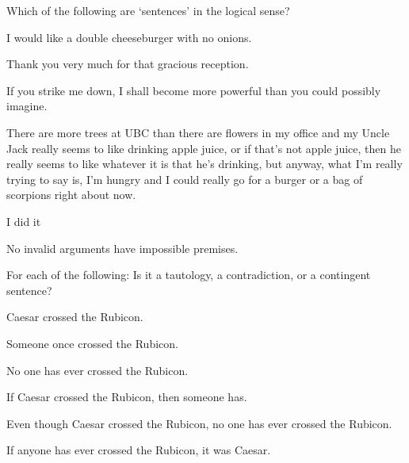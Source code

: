 \problempart
\label{hw1.B}
Which of the following are `sentences' in the logical sense?
	\begin{earg}
		\item I would like a double cheeseburger with no onions.
		\item Thank you very much for that gracious reception.
		\item If you strike me down, I shall become more powerful than you could possibly imagine.
		\item There are more trees at UBC than there are flowers in my office and my Uncle Jack really seems to like drinking apple juice, or if that's not apple juice, then he really seems to like whatever it is that he's drinking, but anyway, what I'm really trying to say is, I'm hungry and I could really go for a burger or a bag of scorpions right about now.
		\item I did it
		\item No invalid arguments have impossible premises.
	\end{earg}

\problempart
\label{pr.EnglishTautology}
For each of the following: Is it a tautology, a contradiction, or a contingent sentence?
\begin{earg}
\item Caesar crossed the Rubicon.
\item Someone once crossed the Rubicon.
\item No one has ever crossed the Rubicon.
\item If Caesar crossed the Rubicon, then someone has.
\item Even though Caesar crossed the Rubicon, no one has ever crossed the Rubicon.
\item If anyone has ever crossed the Rubicon, it was Caesar.
\end{earg}


